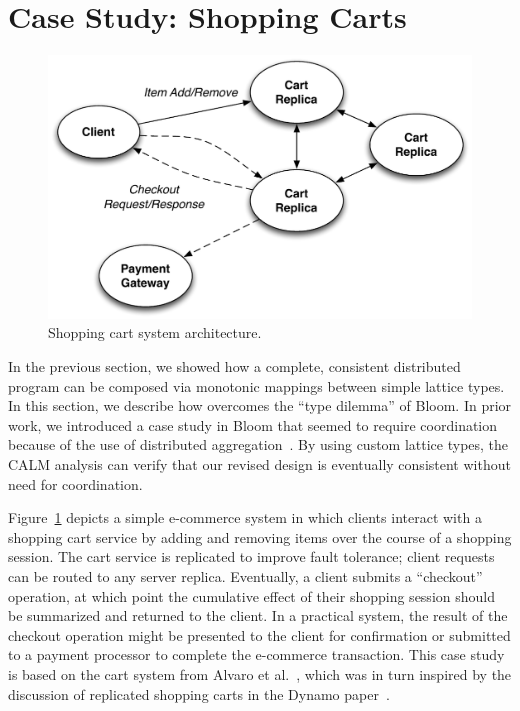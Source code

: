 \section{Case Study: Shopping Carts}
\label{sec:carts}

\begin{figure}[t]
\centering
\includegraphics[width=\linewidth]{fig/cart_arch.pdf}
\caption{Shopping cart system architecture.}
\label{fig:cart-system-arch}
\end{figure}

In the previous section, we showed how a complete, consistent distributed
program can be composed via monotonic mappings between simple lattice types. In
this section, we describe how \lang overcomes the ``type dilemma'' of Bloom. In
prior work, we introduced a case study in Bloom that seemed to require
coordination because of the use of distributed aggregation~\cite{Alvaro2011}. By
using custom lattice types, the \lang CALM analysis can verify that our revised
design is eventually consistent without need for coordination.

Figure~\ref{fig:cart-system-arch} depicts a simple e-commerce system in which
clients interact with a shopping cart service by adding and removing items over
the course of a shopping session. The cart service is replicated to improve
fault tolerance; client requests can be routed to any server
replica. Eventually, a client submits a ``checkout'' operation, at which point
the cumulative effect of their shopping session should be summarized and
returned to the client. In a practical system, the result of the checkout
operation might be presented to the client for confirmation or submitted to a
payment processor to complete the e-commerce transaction. This case study is
based on the cart system from Alvaro et al.~\cite{Alvaro2011}, which was in turn
inspired by the discussion of replicated shopping carts in the Dynamo
paper~\cite{DeCandia2007}.


